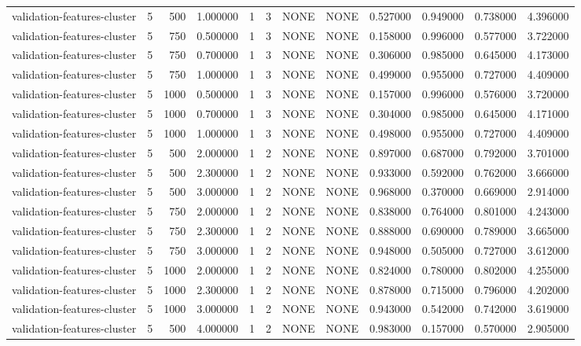 \begin{tabular}{lrrrllllrrrr}
validation-features-cluster & 5 & 500 & 1.000000 & 1 & 3 & NONE & NONE & 0.527000 & 0.949000 & 0.738000 & 4.396000 \\
validation-features-cluster & 5 & 750 & 0.500000 & 1 & 3 & NONE & NONE & 0.158000 & 0.996000 & 0.577000 & 3.722000 \\
validation-features-cluster & 5 & 750 & 0.700000 & 1 & 3 & NONE & NONE & 0.306000 & 0.985000 & 0.645000 & 4.173000 \\
validation-features-cluster & 5 & 750 & 1.000000 & 1 & 3 & NONE & NONE & 0.499000 & 0.955000 & 0.727000 & 4.409000 \\
validation-features-cluster & 5 & 1000 & 0.500000 & 1 & 3 & NONE & NONE & 0.157000 & 0.996000 & 0.576000 & 3.720000 \\
validation-features-cluster & 5 & 1000 & 0.700000 & 1 & 3 & NONE & NONE & 0.304000 & 0.985000 & 0.645000 & 4.171000 \\
validation-features-cluster & 5 & 1000 & 1.000000 & 1 & 3 & NONE & NONE & 0.498000 & 0.955000 & 0.727000 & 4.409000 \\
validation-features-cluster & 5 & 500 & 2.000000 & 1 & 2 & NONE & NONE & 0.897000 & 0.687000 & 0.792000 & 3.701000 \\
validation-features-cluster & 5 & 500 & 2.300000 & 1 & 2 & NONE & NONE & 0.933000 & 0.592000 & 0.762000 & 3.666000 \\
validation-features-cluster & 5 & 500 & 3.000000 & 1 & 2 & NONE & NONE & 0.968000 & 0.370000 & 0.669000 & 2.914000 \\
validation-features-cluster & 5 & 750 & 2.000000 & 1 & 2 & NONE & NONE & 0.838000 & 0.764000 & 0.801000 & 4.243000 \\
validation-features-cluster & 5 & 750 & 2.300000 & 1 & 2 & NONE & NONE & 0.888000 & 0.690000 & 0.789000 & 3.665000 \\
validation-features-cluster & 5 & 750 & 3.000000 & 1 & 2 & NONE & NONE & 0.948000 & 0.505000 & 0.727000 & 3.612000 \\
validation-features-cluster & 5 & 1000 & 2.000000 & 1 & 2 & NONE & NONE & 0.824000 & 0.780000 & 0.802000 & 4.255000 \\
validation-features-cluster & 5 & 1000 & 2.300000 & 1 & 2 & NONE & NONE & 0.878000 & 0.715000 & 0.796000 & 4.202000 \\
validation-features-cluster & 5 & 1000 & 3.000000 & 1 & 2 & NONE & NONE & 0.943000 & 0.542000 & 0.742000 & 3.619000 \\
validation-features-cluster & 5 & 500 & 4.000000 & 1 & 2 & NONE & NONE & 0.983000 & 0.157000 & 0.570000 & 2.905000 \\

\end{tabular}
